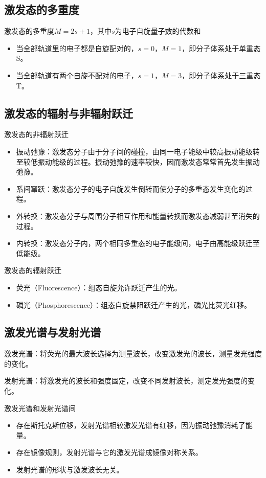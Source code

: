 \subsection{激发态的多重度}
激发态的多重度$M=2s+1$，其中$s$为电子自旋量子数的代数和
\begin{itemize}
    \item 当全部轨道里的电子都是自旋配对的，$s=0$，$M=1$，即分子体系处于单重态S。
    \item 当全部轨道有两个自旋不配对的电子，$s=1$，$M=3$，即分子体系处于三重态T。
\end{itemize}

\subsection{激发态的辐射与非辐射跃迁}
激发态的非辐射跃迁
\begin{itemize}
    \item 振动弛豫：激发态分子由于分子间的碰撞，由同一电子能级中较高振动能级转至较低振动能级的过程。振动弛豫的速率较快，因而激发态常常首先发生振动弛豫。
    \item 系间窜跃：激发态分子的电子自旋发生倒转而使分子的多重态发生变化的过程。
    \item 外转换：激发态分子与周围分子相互作用和能量转换而激发态减弱甚至消失的过程。
    \item 内转换：激发态分子内，两个相同多重态的电子能级间，电子由高能级跃迁至低能级。
\end{itemize}
激发态的辐射跃迁
\begin{itemize}
    \item 荧光（Fluorescence）：组态自旋允许跃迁产生的光。
    \item 磷光（Phosphorescence）：组态自旋禁阻跃迁产生的光，磷光比荧光红移。
\end{itemize}

\subsection{激发光谱与发射光谱}
激发光谱：将荧光的最大波长选择为测量波长，改变激发光的波长，测量发光强度的变化。

发射光谱：将激发光的波长和强度固定，改变不同发射波长，测定发光强度的变化。

激发光谱和发射光谱间
\begin{itemize}
    \item 存在斯托克斯位移，发射光谱相较激发光谱有红移，因为振动弛豫消耗了能量。
    \item 存在镜像规则，发射光谱与它的激发光谱成镜像对称关系。
    \item 发射光谱的形状与激发波长无关。
\end{itemize}


